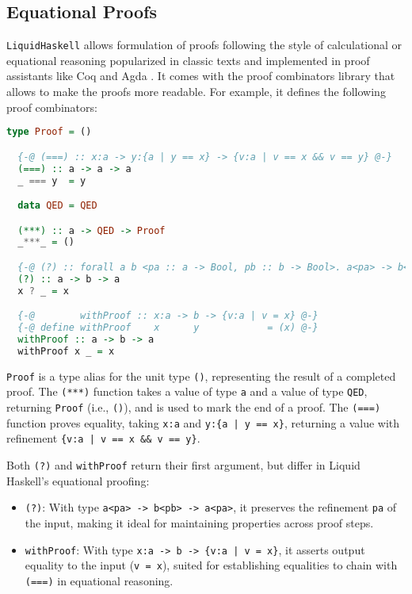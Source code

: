 \documentclass[]{rptuseminar}
\begin{document}
\subsection{Equational Proofs}
\texttt{LiquidHaskell} allows formulation of proofs following the style of calculational or equational reasoning popularized in classic texts
and implemented in proof assistants like Coq and Agda \cite{vazou_refinement_2018}.
It comes with the proof combinators library that allows to make the proofs more readable.
For example, it defines the following proof combinators:

\begin{lstlisting}[language=haskell, label={lst:proof-combinators}]
  type Proof = ()

  {-@ (===) :: x:a -> y:{a | y == x} -> {v:a | v == x && v == y} @-}
  (===) :: a -> a -> a
  _ === y  = y

  data QED = QED

  (***) :: a -> QED -> Proof
  _***_ = ()

  {-@ (?) :: forall a b <pa :: a -> Bool, pb :: b -> Bool>. a<pa> -> b<pb> -> a<pa> @-}
  (?) :: a -> b -> a
  x ? _ = x

  {-@        withProof :: x:a -> b -> {v:a | v = x} @-}
  {-@ define withProof    x      y            = (x) @-}
  withProof :: a -> b -> a
  withProof x _ = x
\end{lstlisting}
\vspace{1em}

\texttt{Proof} is a type alias for the unit type \texttt{()}, representing the result of a completed proof. The \texttt{(***)} function takes a value of type \texttt{a} and a value of type \texttt{QED}, returning \texttt{Proof} (i.e., \texttt{()}), and is used to mark the end of a proof. The \texttt{(===)} function proves equality, taking \texttt{x:a} and \texttt{y:\{a | y == x\}}, returning a value with refinement \texttt{\{v:a | v == x \&\& v == y\}}.

Both \texttt{(?)} and \texttt{withProof} return their first argument, but differ in Liquid Haskell’s equational proofing:
\begin{itemize}
  \item \texttt{(?)}: With type \texttt{a<pa> -> b<pb> -> a<pa>}, it preserves the refinement \texttt{pa} of the input, making it ideal for maintaining properties across proof steps.
  \item \texttt{withProof}: With type \texttt{x:a -> b -> \{v:a | v = x\}}, it asserts output equality to the input (\texttt{v = x}), suited for establishing equalities to chain with \texttt{(===)} in equational reasoning.
\end{itemize}
\end{document}

